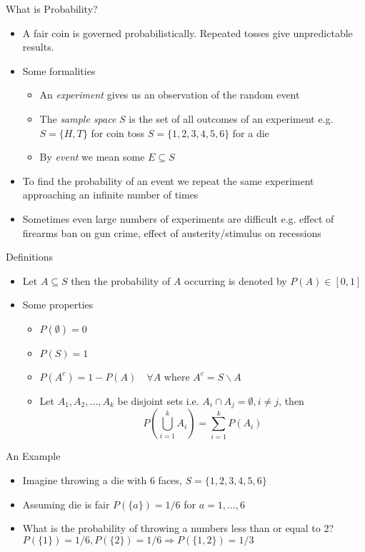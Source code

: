 \documentclass{beamer}
\begin{document}
\begin{frame}{What is Probability?} 
\begin{itemize}
 \item A fair coin is governed probabilistically. Repeated tosses give unpredictable results. 
 \item Some formalities 
 \begin{itemize}
 \item An \emph{experiment} gives us an observation of the random event
 \item The \emph{sample space} $S$ is the set of all outcomes of an experiment e.g. $S = \{H, T\}$ for coin toss $S = \{1,2,3,4,5,6\}$ for a die  
 \item By \emph{event} we mean some $E \subseteq S$ 
 \end{itemize} 
 \item To find the probability of an event we repeat the same experiment approaching an infinite number of times 
 \item Sometimes even large numbers of experiments are difficult e.g. effect of firearms ban on gun crime, effect of austerity/stimulus on recessions 
\end{itemize}
\end{frame}

\begin{frame}{Definitions}
\begin{itemize}
 \item Let $A \subseteq S$ then the probability of $A$ occurring is denoted by $P(A) \in [0, 1]$
 \item Some properties 
 \begin{itemize}
 \item $P(\emptyset) = 0$
 \item $P(S) = 1$
 \item $P(A^c) = 1 - P(A) \quad \forall A$  where $A^c = S \backslash A$
 \item Let $A_1, A_2, \ldots, A_k$ be disjoint sets i.e. $A_i \cap A_j = \emptyset, i \neq j$, then 
 \begin{displaymath} 
  P\left(\bigcup_{i=1}^k A_i \right) = \sum_{i=1}^k P(A_i)
 \end{displaymath}
 \end{itemize} 
\end{itemize}
\end{frame}

\begin{frame}{An Example} 
\begin{itemize} 
 \item Imagine throwing a die with 6 faces, $S = \{1,2,3,4,5,6\}$
\item Assuming die is fair $P(\{a\}) = 1/6$ for $a = 1, \ldots, 6$
\item What is the probability of throwing a numbers less than or equal to 2? $P(\{1\}) = 1/6, P(\{2\}) = 1/6 \Rightarrow P(\{1, 2\}) = 1/3$
\end{itemize}
\end{frame}
\end{document}
